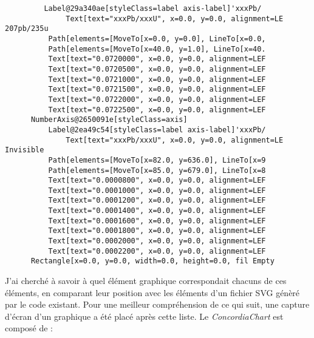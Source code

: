 \begin{verbatim}
         Label@29a340ae[styleClass=label axis-label]'xxxPb/
              Text[text="xxxPb/xxxU", x=0.0, y=0.0, alignment=LE 207pb/235u
          Path[elements=[MoveTo[x=0.0, y=0.0], LineTo[x=0.0, 
          Path[elements=[MoveTo[x=40.0, y=1.0], LineTo[x=40. 
          Text[text="0.0720000", x=0.0, y=0.0, alignment=LEF
          Text[text="0.0720500", x=0.0, y=0.0, alignment=LEF
          Text[text="0.0721000", x=0.0, y=0.0, alignment=LEF
          Text[text="0.0721500", x=0.0, y=0.0, alignment=LEF
          Text[text="0.0722000", x=0.0, y=0.0, alignment=LEF
          Text[text="0.0722500", x=0.0, y=0.0, alignment=LEF
      NumberAxis@2650091e[styleClass=axis]
          Label@2ea49c54[styleClass=label axis-label]'xxxPb/
              Text[text="xxxPb/xxxU", x=0.0, y=0.0, alignment=LE Invisible
          Path[elements=[MoveTo[x=82.0, y=636.0], LineTo[x=9
          Path[elements=[MoveTo[x=85.0, y=679.0], LineTo[x=8
          Text[text="0.0000800", x=0.0, y=0.0, alignment=LEF
          Text[text="0.0001000", x=0.0, y=0.0, alignment=LEF
          Text[text="0.0001200", x=0.0, y=0.0, alignment=LEF
          Text[text="0.0001400", x=0.0, y=0.0, alignment=LEF
          Text[text="0.0001600", x=0.0, y=0.0, alignment=LEF
          Text[text="0.0001800", x=0.0, y=0.0, alignment=LEF
          Text[text="0.0002000", x=0.0, y=0.0, alignment=LEF
          Text[text="0.0002200", x=0.0, y=0.0, alignment=LEF
      Rectangle[x=0.0, y=0.0, width=0.0, height=0.0, fil Empty
\end{verbatim}
J'ai cherché à savoir à quel élément graphique correspondait chacuns de ces éléments, en comparant leur position avec les éléments d'un fichier SVG génèré par le code existant.  Pour une meilleur compréhension de ce qui suit, une capture d'écran d'un graphique a été placé après cette liste. Le \textit{ConcordiaChart} est composé de :
